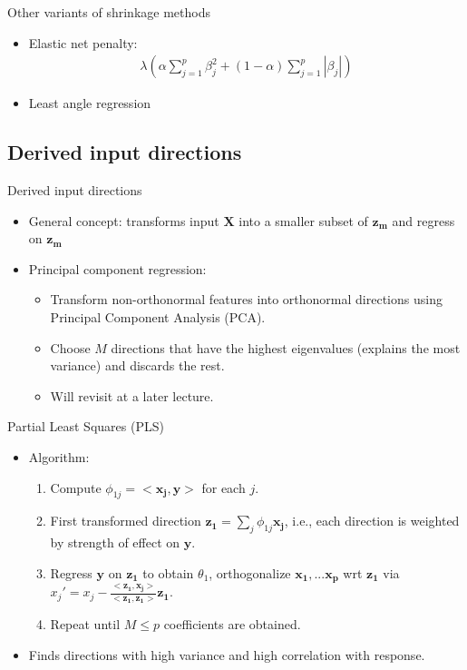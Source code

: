 \documentclass[aspectratio=169]{beamer}
\let \vec \mathbf
\begin{document}
\begin{frame}{Other variants of shrinkage methods}
    \begin{itemize}
        \item Elastic net penalty:
        \begin{eqnarray*}
            \lambda \left( \alpha \sum_{j=1}^p \beta_j^2+ (1-\alpha) \sum_{j=1}^p |\beta_j| \right)
        \end{eqnarray*}
        \item Least angle regression
    \end{itemize}
\end{frame}


\subsection{Derived input directions}

\begin{frame}{Derived input directions}
    \begin{itemize}
        \item General concept: transforms input $\vec{X}$ into a smaller subset of $\vec{z_m}$ and regress on $\vec{z_m}$
        \item Principal component regression:
        \begin{itemize}
            \item Transform non-orthonormal features into orthonormal directions using Principal Component Analysis (PCA).
            \item Choose $M$ directions that have the highest eigenvalues (explains the most variance) and discards the rest.
            \item Will revisit at a later lecture.
        \end{itemize}
    \end{itemize}
\end{frame} 


\begin{frame}{Partial Least Squares (PLS)}
    \begin{itemize}
        \item Algorithm:
        \begin{enumerate}
            \item Compute $\phi_{1j} = <\vec{x_j}, \vec{y}>$ for each $j$.
            \item First transformed direction $\vec{z_1} = \sum_j \phi_{1j} \vec{x_j}$, i.e., each direction is weighted by strength of effect on $\vec{y}$.
            \item Regress $\vec{y}$ on $\vec{z_1}$ to obtain $\theta_1$, orthogonalize $\vec{x_1}, ... \vec{x_p}$ wrt $\vec{z_1}$ via $x_j' = x_j - \frac{<\vec{z_1}, \vec{x_j}>}{<\vec{z_1}, \vec{z_1}>}\vec{z_1}$.
            \item Repeat until $M \leq p$ coefficients are obtained.
        \end{enumerate}
        \item Finds directions with high variance and high correlation with response.
    \end{itemize}
\end{frame} 
\end{document}
